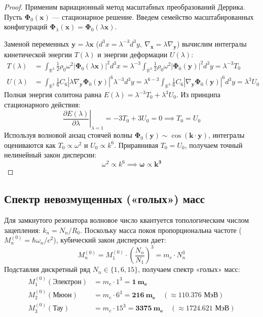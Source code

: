 \documentclass[12pt,a4paper]{article}
\begin{document}
	\begin{proof}
		Применим вариационный метод масштабных преобразований Деррика. Пусть $\boldsymbol{\Phi}_0(\mathbf{x})$ — стационарное решение. Введем семейство масштабированных конфигураций $\boldsymbol{\Phi}_\lambda(\mathbf{x}) = \boldsymbol{\Phi}_0(\lambda \mathbf{x})$. 
		
		Заменой переменных $\mathbf{y} = \lambda \mathbf{x}$ ($d^3x = \lambda^{-3} d^3y, \ \nabla_\mathbf{x} = \lambda \nabla_\mathbf{y}$) вычислим интегралы кинетической энергии $T(\lambda)$ и энергии деформации $U(\lambda)$:
		\begin{align}
			T(\lambda) &= \int_{\mathbb{R}^3} \frac{1}{2} \rho_0 \omega^2 |\boldsymbol{\Phi}_0(\lambda \mathbf{x})|^2 d^3x = \lambda^{-3} \int_{\mathbb{R}^3} \frac{1}{2} \rho_0 \omega^2 |\boldsymbol{\Phi}_0(\mathbf{y})|^2 d^3y = \lambda^{-3} T_0 \\
			U(\lambda) &= \int_{\mathbb{R}^3} \frac{1}{6} C_6 |\lambda \nabla_\mathbf{y} \boldsymbol{\Phi}_0(\mathbf{y})|^6 \lambda^{-3} d^3y = \lambda^{6 - 3} \int_{\mathbb{R}^3} \frac{1}{6} C_6 |\nabla_\mathbf{y} \boldsymbol{\Phi}_0(\mathbf{y})|^6 d^3y = \lambda^3 U_0
		\end{align}
		Полная энергия солитона равна $E(\lambda) = \lambda^{-3} T_0 + \lambda^3 U_0$. 
		Из принципа стационарного действия:
		\begin{equation}
			\left. \frac{\partial E(\lambda)}{\partial \lambda} \right|_{\lambda=1} = -3 T_0 + 3 U_0 = 0 \implies T_0 = U_0
		\end{equation}
		Используя волновой анзац стоячей волны $\boldsymbol{\Phi}_0(\mathbf{y}) \sim \cos(\mathbf{k} \cdot \mathbf{y})$, интегралы оцениваются как $T_0 \propto \omega^2$ и $U_0 \propto k^6$. Приравнивая $T_0 = U_0$, получаем точный нелинейный закон дисперсии:
		\begin{equation}
			\omega^2 \propto k^6 \implies \mathbf{\omega \propto k^3}
		\end{equation}
	\end{proof}
	
	\subsection{Спектр невозмущенных («голых») масс}
	Для замкнутого резонатора волновое число квантуется топологическим числом зацепления: $k_n = N_n / R_0$. Поскольку масса покоя пропорциональна частоте ($M_n^{(0)} = \hbar \omega_n / c^2$), кубический закон дисперсии дает:
	\begin{equation}
		M_n^{(0)} = M_1^{(0)} \cdot \left( \frac{N_n}{N_1} \right)^3 = m_e \cdot N_n^3
	\end{equation}
	Подставляя дискретный ряд $N_n \in \{1, 6, 15\}$, получаем спектр «голых» масс:
	\begin{align}
		M_1^{(0)} (\text{Электрон}) &= m_e \cdot 1^3  = \mathbf{1 \ m_e} \\
		M_2^{(0)} (\text{Мюон})     &= m_e \cdot 6^3  = \mathbf{216 \ m_e} \quad (\approx 110.376 \text{ МэВ}) \\
		M_3^{(0)} (\text{Тау})      &= m_e \cdot 15^3 = \mathbf{3375 \ m_e} \quad (\approx 1724.621 \text{ МэВ})
	\end{align}
	
\end{document}
